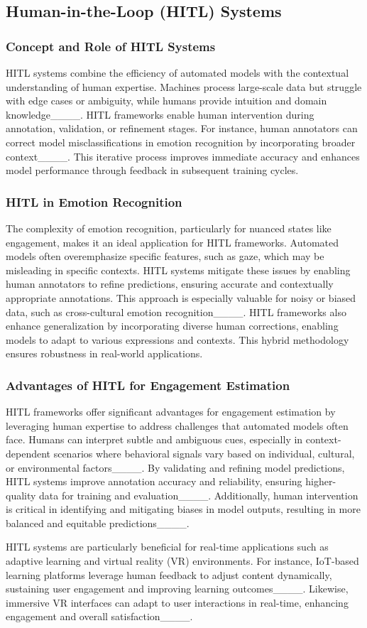 \subsection{Human-in-the-Loop (HITL) Systems}
\subsubsection{Concept and Role of HITL Systems}
HITL systems combine the efficiency of automated models with the contextual understanding of human expertise. Machines process large-scale data but struggle with edge cases or ambiguity, while humans provide intuition and domain knowledge____. HITL frameworks enable human intervention during annotation, validation, or refinement stages. For instance, human annotators can correct model misclassifications in emotion recognition by incorporating broader context____. This iterative process improves immediate accuracy and enhances model performance through feedback in subsequent training cycles.

\subsubsection{HITL in Emotion Recognition}
The complexity of emotion recognition, particularly for nuanced states like engagement, makes it an ideal application for HITL frameworks. Automated models often overemphasize specific features, such as gaze, which may be misleading in specific contexts. HITL systems mitigate these issues by enabling human annotators to refine predictions, ensuring accurate and contextually appropriate annotations. This approach is especially valuable for noisy or biased data, such as cross-cultural emotion recognition____. HITL frameworks also enhance generalization by incorporating diverse human corrections, enabling models to adapt to various expressions and contexts. This hybrid methodology ensures robustness in real-world applications.

\subsubsection{Advantages of HITL for Engagement Estimation}
HITL frameworks offer significant advantages for engagement estimation by leveraging human expertise to address challenges that automated models often face. Humans can interpret subtle and ambiguous cues, especially in context-dependent scenarios where behavioral signals vary based on individual, cultural, or environmental factors____. By validating and refining model predictions, HITL systems improve annotation accuracy and reliability, ensuring higher-quality data for training and evaluation____. Additionally, human intervention is critical in identifying and mitigating biases in model outputs, resulting in more balanced and equitable predictions____. 

HITL systems are particularly beneficial for real-time applications such as adaptive learning and virtual reality (VR) environments. For instance, IoT-based learning platforms leverage human feedback to adjust content dynamically, sustaining user engagement and improving learning outcomes____. Likewise, immersive VR interfaces can adapt to user interactions in real-time, enhancing engagement and overall satisfaction____.